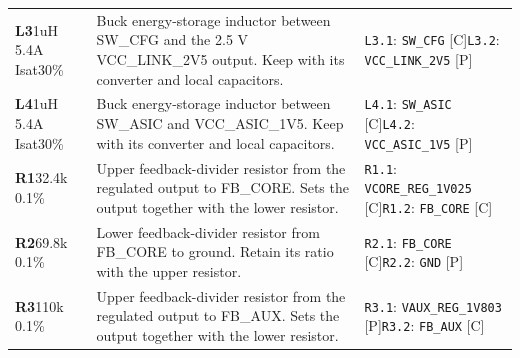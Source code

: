 \documentclass[11pt,a4paper]{article}
\begin{document}
\begin{longtable}{@{}P{27mm}P{83mm}P{58mm}@{}}
\textbf{L3}\newline 1uH 5.4A Isat30\% & Buck energy-storage inductor between SW\_CFG and the 2.5 V VCC\_LINK\_2V5 output. Keep with its converter and local capacitors. & \nolinkurl{L3.1}: \nolinkurl{SW_CFG} [C]\newline \nolinkurl{L3.2}: \nolinkurl{VCC_LINK_2V5} [P] \\
\textbf{L4}\newline 1uH 5.4A Isat30\% & Buck energy-storage inductor between SW\_ASIC and VCC\_ASIC\_1V5. Keep with its converter and local capacitors. & \nolinkurl{L4.1}: \nolinkurl{SW_ASIC} [C]\newline \nolinkurl{L4.2}: \nolinkurl{VCC_ASIC_1V5} [P] \\
\textbf{R1}\newline 32.4k 0.1\% & Upper feedback-divider resistor from the regulated output to FB\_CORE. Sets the output together with the lower resistor. & \nolinkurl{R1.1}: \nolinkurl{VCORE_REG_1V025} [C]\newline \nolinkurl{R1.2}: \nolinkurl{FB_CORE} [C] \\
\textbf{R2}\newline 69.8k 0.1\% & Lower feedback-divider resistor from FB\_CORE to ground. Retain its ratio with the upper resistor. & \nolinkurl{R2.1}: \nolinkurl{FB_CORE} [C]\newline \nolinkurl{R2.2}: \nolinkurl{GND} [P] \\
\textbf{R3}\newline 110k 0.1\% & Upper feedback-divider resistor from the regulated output to FB\_AUX. Sets the output together with the lower resistor. & \nolinkurl{R3.1}: \nolinkurl{VAUX_REG_1V803} [P]\newline \nolinkurl{R3.2}: \nolinkurl{FB_AUX} [C] \\

\end{longtable}
\end{document}
